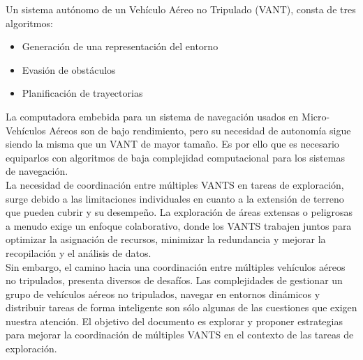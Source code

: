\documentclass[sigconf]{acmart}
\begin{document}
Un sistema autónomo de un Vehículo Aéreo no Tripulado (VANT), consta de tres algoritmos:

\begin{itemize}
\item Generación de una representación del entorno
\item Evasión de obstáculos
\item Planificación de trayectorias
\end{itemize}

La computadora embebida para un sistema de navegación usados en Micro-Vehículos Aéreos son de bajo rendimiento, pero su necesidad de autonomía sigue siendo la misma que un VANT de mayor tamaño. Es por ello que es necesario equiparlos con algoritmos de baja complejidad computacional para los sistemas de navegación.\\

La necesidad de coordinación entre múltiples VANTS en tareas de exploración, surge debido a las limitaciones individuales en cuanto a la extensión de terreno que pueden cubrir y su desempeño. La exploración de áreas extensas o peligrosas a menudo exige un enfoque colaborativo, donde los VANTS trabajen juntos para optimizar la asignación de recursos, minimizar la redundancia y mejorar la recopilación y el análisis de datos.\\ %

Sin embargo, el camino hacia una coordinación entre múltiples vehículos aéreos no tripulados, presenta diversos de desafíos. Las complejidades de gestionar un grupo de vehículos aéreos no tripulados, navegar en entornos dinámicos y distribuir tareas de forma inteligente son sólo algunas de las cuestiones que exigen nuestra atención. El objetivo del documento es explorar y proponer estrategias para mejorar la coordinación de múltiples VANTS en el contexto de las tareas de exploración.\\

\end{document}
